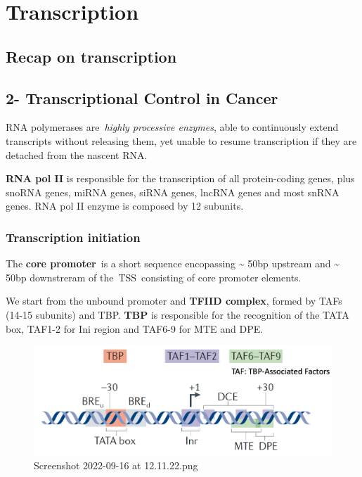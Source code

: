 \graphicspath{{chapters/_resources/}}

\chapter{Transcription}

\section{Recap on transcription}
\hypertarget{transcriptional-control-in-cancer}{%
\section{2- Transcriptional Control in Cancer}\label{transcriptional-control-in-cancer}}

RNA polymerases are~\emph{highly processive enzymes}, able to continuously extend transcripts without releasing them, yet unable to resume transcription if they are detached from the nascent RNA.

\textbf{RNA pol II} is responsible for the transcription of all protein-coding genes, plus snoRNA genes, miRNA genes, siRNA genes, lncRNA genes and most snRNA genes. RNA pol II enzyme is composed by 12 subunits.

\hypertarget{transcription-initiation}{%
\subsection{Transcription initiation}\label{transcription-initiation}}

The \textbf{core promoter}~is a short sequence encopassing \textasciitilde{} 50bp upstream and \textasciitilde{} 50bp downstreram of the~TSS~consisting of core promoter elements.

We start from the unbound promoter and \textbf{TFIID complex}, formed by TAFs (14-15 subunits) and TBP. \textbf{TBP} is responsible for the recognition of the TATA box, TAF1-2 for Ini region and TAF6-9 for MTE and DPE.

\begin{figure}
\centering
\includegraphics[width=\textwidth]{../_resources/Screenshot_2022-09-16_at_12-11-22.png}
\caption{Screenshot 2022-09-16 at 12.11.22.png}
\end{figure}

